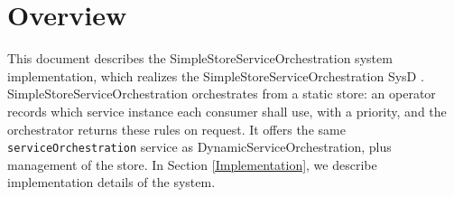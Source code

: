 \documentclass[a4paper]{arrowhead}
\begin{document}
\sloppy

\ArrowheadSetup

\begin{center}
  \vspace*{1cm}
  \huge{\arrowtitle}

  \vspace*{0.2cm}
  \LARGE{\arrowtype}
  \vspace*{1cm}

  \vspace*{\fill}


  \vspace*{1cm}
  \vspace*{\fill}

  \begin{abstract}
    This document describes the design and implementation of the SimpleStoreServiceOrchestration core system of Arrowhead 5.2.2 in Java Spring (\texttt{ah5-core-java-spring/serviceorchestration-simple}).
  \end{abstract}

  \vspace*{1cm}
\end{center}

\newpage

\tableofcontents
\newpage

\section{Overview}
\label{sec:overview}

This document describes the SimpleStoreServiceOrchestration system implementation, which realizes the SimpleStoreServiceOrchestration SysD \cite{ssso-sysd}. Simple\allowbreak{}Store\allowbreak{}Service\allowbreak{}Orchestration orchestrates from a static store: an operator records which service instance each consumer shall use, with a priority, and the orchestrator returns these rules on request. It offers the same \texttt{service\allowbreak{}Orchestration} service as Dynamic\allowbreak{}Service\allowbreak{}Orchestration, plus management of the store.
In Section \ref{Implementation}, we describe implementation details of the system.
\end{document}
